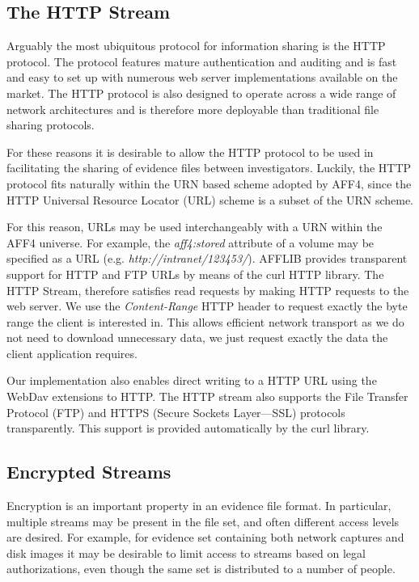 \documentclass[10pt, conference]{IEEEtran}
\begin{document}
\subsection{The HTTP Stream}
Arguably the most ubiquitous protocol for information sharing is the
HTTP protocol\cite{HTTP_RFC}. The protocol features mature
authentication and auditing and is fast and easy to set up with
numerous web server implementations available on the market. The HTTP
protocol is also designed to operate across a wide range of network
architectures and is therefore more deployable than traditional file
sharing protocols.

For these reasons it is desirable to allow the HTTP protocol to be
used in facilitating the sharing of evidence files between
investigators. Luckily, the HTTP protocol fits naturally within the
URN based scheme adopted by AFF4, since the HTTP Universal Resource
Locator (URL) scheme is a subset of the URN scheme.

For this reason, URLs may be used interchangeably with a URN within
the AFF4 universe. For example, the \emph{aff4:stored} attribute of a
volume may be specified as a URL
(e.g. \emph{http://intranet/123453/}).  AFFLIB provides transparent
support for HTTP and FTP URLs by means of the curl HTTP
library\cite{libcurl}. The HTTP Stream, therefore satisfies read
requests by making HTTP requests to the web server. We use the
\emph{Content-Range} HTTP header to request exactly the byte range the
client is interested in. This allows efficient network transport as we
do not need to download unnecessary data, we just request exactly the
data the client application requires.

Our implementation also enables direct writing to a HTTP URL using the
WebDav extensions to HTTP\cite{webdav-rfc}. The HTTP stream also
supports the File Transfer Protocol (FTP) and HTTPS (Secure Sockets
Layer---SSL) protocols transparently. This support is provided
automatically by the curl library.

\subsection{Encrypted Streams}
\label{crypted_stream}
Encryption is an important property in an evidence file format. In
particular, multiple streams may be present in the file set, and often
different access levels are desired. For example, for evidence set
containing both network captures and disk images it may be desirable
to limit access to streams based on legal authorizations, even though
the same set is distributed to a number of people.
\end{document}

